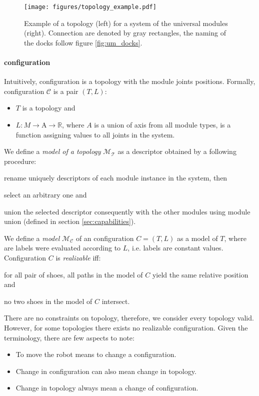 \begin{figure}[t]
    \centering
    \texttt{[image: figures/topology\_example.pdf]}
    \caption{Example of a topology (left) for a system of the universal modules
    (right). Connection are denoted by gray rectangles, the naming of the docks
    follow figure \ref{fig:um_docks}. }
    \label{fig:topology_example}
\end{figure}

\paragraph{configuration} Intuitively, configuration is a topology with the
 module joints positions. Formally, configuration $\mathcal{C}$ is a pair $(T,
 L)$:
 \begin{itemize}
    \item $T$ is a topology and
    \item $L: M \rightarrow \text{A} \rightarrow \mathds{R}$, where $A$ is a
    union of axis from all module types, is a function assigning values to all
    joints in the system.
 \end{itemize}

We define a \emph{model of a topology} $\mathcal{M}_\mathcal{T}$ as a descriptor
obtained by a following procedure:
\begin{enumerate*}
    \item rename uniquely descriptors of each module instance in the system, then
    \item select an arbitrary one and
    \item union the selected descriptor consequently with the other modules
    using module union (defined in section \ref{sec:capabilities}).
\end{enumerate*}
We define a \emph{model} $\mathcal{M}_\mathcal{C}$ of an configuration
$C=(T, L)$ as a model of $T$, where are labels were evaluated according to $L$,
i.e. labels are constant values. Configuration $C$ is \emph{realizable} iff:
\begin{enumerate*}
    \item for all pair of shoes, all paths in the model of $C$ yield the same
    relative position and
    \item no two shoes in the model of $C$ intersect.
\end{enumerate*}

There are no constraints on topology, therefore, we consider every topology
valid. However, for some topologies there exists no realizable configuration.
Given the terminology, there are few aspects to note:
\begin{itemize}
    \item To move the robot means to change a configuration.
    \item Change in configuration can also mean change in topology.
    \item Change in topology always mean a change of configuration.
\end{itemize}

